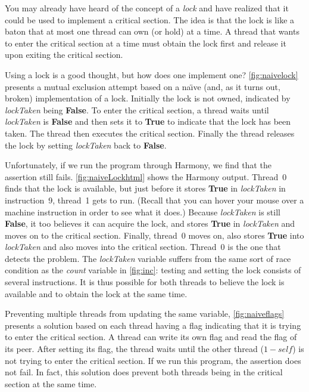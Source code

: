 \documentclass{report}
\begin{document}
%

You may already have heard of the concept of a \emph{lock}
%
and have realized that
it could be used to implement a critical section.
The idea is that the lock is like a baton that at most one thread can own
(or hold) at a time.
A thread that wants to enter the critical section at a time must obtain the
lock first and release it upon exiting the critical section.

Using a lock is a good thought, but how does one implement one?
\autoref{fig:naivelock} presents a mutual exclusion attempt based on a
na\"{\i}ve (and, as it turns out, broken) implementation of a lock.
Initially the lock is not owned, indicated by \textit{lockTaken} being \textbf{False}.
To enter the critical section, a thread waits until \textit{lockTaken} is \textbf{False}
and then sets it to \textbf{True} to indicate that the lock has been taken.
The thread then executes the critical section.  Finally the thread
releases the lock by setting \textit{lockTaken} back to \textbf{False}.

Unfortunately, if we run the program through Harmony,
we find that the assertion still fails.
\autoref{fig:naiveLockhtml} shows the Harmony output.
Thread~0 finds that the lock is available, but just before it stores
\textbf{True} in \textit{lockTaken} in instruction~9, thread~1 gets
to run.
(Recall that you can hover your mouse over a machine instruction in order
to see what it does.)
Because \textit{lockTaken} is still \textbf{False}, it too
believes it can acquire the lock, and stores \textbf{True} in
\textit{lockTaken} and moves on to the critical section.
Finally, thread~0 moves on, also stores \textbf{True}
into \textit{lockTaken} and also moves
into the critical section.  Thread~0 is the one that detects the
problem.
The \textit{lockTaken} variable
suffers from the same sort of race condition as the \textit{count} variable
in \autoref{fig:inc}: testing and setting the lock
consists of several instructions.  It is thus possible
for both threads to believe the lock is available and to obtain the lock
at the same time.

Preventing multiple threads from updating the same variable,
\autoref{fig:naiveflags} presents a solution based on each thread having
a flag indicating that it is trying to enter the critical section.
A thread can write its own flag and read the flag of its peer.
After setting its flag, the thread waits until the other thread
($1 - \mathit{self}$) is not trying to enter the critical section.
If we run this program, the assertion does not fail.  In fact, this
solution does prevent both threads being in the critical section at
the same time.
\end{document}
